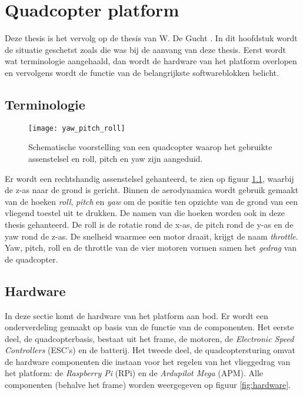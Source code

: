 \chapter{Quadcopter platform}


Deze thesis is het vervolg op de thesis van W. De Gucht \cite{thesis:wouter}. In dit hoofdstuk wordt de situatie geschetst zoals die was bij de aanvang van deze thesis. Eerst wordt wat terminologie aangehaald, dan wordt de hardware van het platform overlopen en vervolgens wordt de functie van de belangrijkste softwareblokken belicht.

\section{Terminologie}

\begin{figure}[h]
	\centering
	\texttt{[image: yaw\_pitch\_roll]}
	\caption{Schematische voorstelling van een quadcopter waarop het gebruikte assenstelsel en roll, pitch en yaw zijn aangeduid.}\label{fig:yaw_pitch_roll}
\end{figure}
\noindent Er wordt een rechtshandig assenstelsel gehanteerd, te zien op figuur \ref{fig:yaw_pitch_roll}, waarbij de z-as naar de grond is gericht. Binnen de aerodynamica wordt gebruik gemaakt van de hoeken \textit{roll}, \textit{pitch} en \textit{yaw} om de positie ten opzichte van de grond van een vliegend toestel uit te drukken. De namen van die hoeken worden ook in deze thesis gehanteerd. De roll is de rotatie rond de x-as, de pitch rond de y-as en de yaw rond de z-as. De snelheid waarmee een motor draait, krijgt de naam \textit{throttle}. Yaw, pitch, roll en de throttle van de vier motoren vormen samen het \textit{gedrag} van de quadcopter.

\section{Hardware}
In deze sectie komt de hardware van het platform aan bod. Er wordt een onderverdeling gemaakt op basis van de functie van de componenten. Het eerste deel, de quadcopterbasis, bestaat uit het frame, de motoren, de \textit{Electronic Speed Controllers} (ESC's) en de batterij. Het tweede deel, de quadcoptersturing omvat de hardware componenten die instaan voor het regelen van het vlieggedrag van het platform: de \textit{Raspberry Pi} (RPi) en de \textit{Ardupilot Mega} (APM). Alle componenten (behalve het frame) worden weergegeven op figuur \ref{fig:hardware}.

